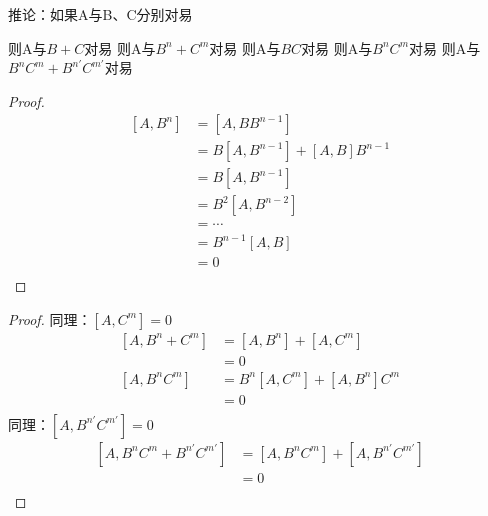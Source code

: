 \begin{frame} 
    \begin{tcolorbox2}{推论：如果A与B、C分别对易}
        \begin{itemize}
            \Item 则A与$B+C$对易
            \Item 则A与$B^n+C^m$对易
            \Item 则A与$BC$对易
            \Item 则A与$B^nC^m$对易
            \Item 则A与$B^nC^m+B^{n'}C^{m'}$对易
        \end{itemize}
    \end{tcolorbox2}
\end{frame} 

\begin{frame} [allowframebreaks=]
    \begin{proof}{}
        \begin{equation*}
            \begin{split} 
             [A,B^{n}]&=[A,BB^{n-1}] \\
             &=B[A,B^{n-1}]+[A,B]B^{n-1}\\
             &=B[A,B^{n-1}] \\
             &=B^2[A,B^{n-2}]\\
             &=\cdots\\
             &=B^{n-1}[A,B]\\
             &= 0\\
            \end{split}  
        \end{equation*}  
    \end{proof}
    \begin{proof}{}
        同理：$[A,C^{m}]=0$\\
        \begin{equation*}
            \begin{split} 
            [A,B^{n}+C^{m}] &= [A,B^{n}]+[A,C^{m}]\\
            &=0 \\
            [A,B^{n}C^{m}] &= B^{n}[A,C^{m}] + [A,B^{n}] C^{m}\\
            &=0 \\
        \end{split}  
        \end{equation*}
        同理：$[A,B^{n'}C^{m'}]=0$\\
        \begin{equation*}
            \begin{split} 
            [A,B^{n}C^{m}+B^{n'}C^{m'}] &= [A,B^{n}C^{m}]+[A,B^{n'}C^{m'}]\\
            &=0\\
        \end{split}  
        \end{equation*}
    \end{proof}
\end{frame} 

